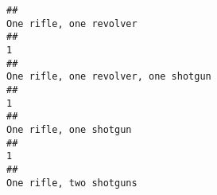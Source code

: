 \documentclass[
]{article}
\begin{document}
\begin{verbatim}
##                                                                                                                                                                                                                                                                                                                                                                               One rifle, one revolver 
##                                                                                                                                                                                                                                                                                                                                                                                                     1 
##                                                                                                                                                                                                                                                                                                                                                                  One rifle, one revolver, one shotgun 
##                                                                                                                                                                                                                                                                                                                                                                                                     1 
##                                                                                                                                                                                                                                                                                                                                                                                One rifle, one shotgun 
##                                                                                                                                                                                                                                                                                                                                                                                                     1 
##                                                                                                                                                                                                                                                                                                                                                                               One rifle, two shotguns 

\end{verbatim}
\end{document}
